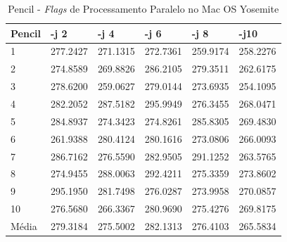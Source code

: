 \begin{apendicesenv}
\begin{table}[!ht]
\centering
\tiny
\caption{Pencil - \textit{Flags} de Processamento Paralelo no Mac OS Yosemite}
\label{tab:flag_processamento_paralelo:mac:pencil}
\begin{tabular}{llllll}
\textbf{Pencil} & \textbf{-j 2} & \textbf{-j 4} & \textbf{-j 6} & \textbf{-j 8} & \textbf{-j10}  \\ \toprule
1               & 277.2427  &   271.1315 &    272.7361  &   259.9174  &   258.2276          \\ 
2               & 274.8589  &   269.8826 &    286.2105  &   279.3511  &   262.6175          \\ 
3               & 278.6200  &   259.0627 &    279.0144  &   273.6935  &   254.1095          \\ 
4               & 282.2052  &   287.5182 &    295.9949  &   276.3455  &   268.0471          \\ 
5               & 284.8937  &   274.3423 &    274.8261  &   285.8305  &   269.4830          \\ 
6               & 261.9388  &   280.4124 &    280.1616  &   273.0806  &   266.0093          \\ 
7               & 286.7162  &   276.5590 &    282.9505  &   291.1252  &   263.5765          \\ 
8               & 274.9455  &   288.0063 &    292.4211  &   275.3359  &   273.8602          \\ 
9               & 295.1950  &   281.7498 &    276.0287  &   273.9958  &   270.0857          \\ 
10              & 276.5680  &   266.3367 &    280.9690  &   275.4276  &   269.8175          \\ \bottomrule
Média           & 279.3184  &   275.5002 &    282.1313  &   276.4103  &   265.5834          \\ 
\end{tabular}
\end{table}


\end{apendicesenv}
